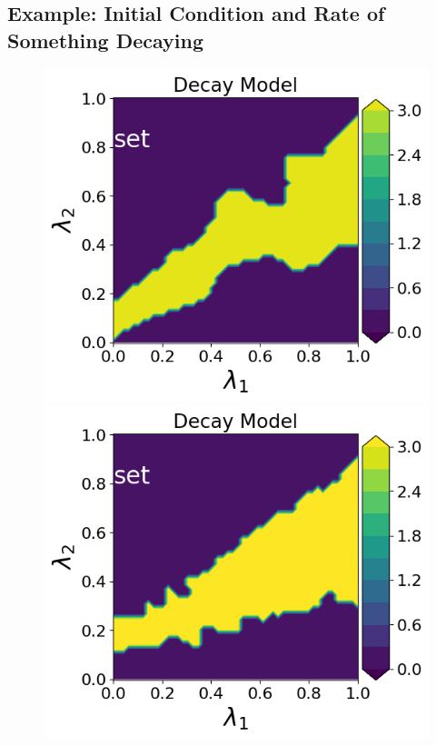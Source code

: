 \subsection{Example: Initial Condition and Rate of Something Decaying}\label{ex:decay-set-sample-accuracy}

\begin{figure}[h]
\begin{minipage}{.4\textwidth}
\includegraphics[width=\linewidth]{examples/fig_decay_q1/DecayModel--set_N50_em.png}
\includegraphics[width=\linewidth]{examples/fig_decay_q1/DecayModel--set_N500_em.png}


\end{minipage}
\end{figure}
